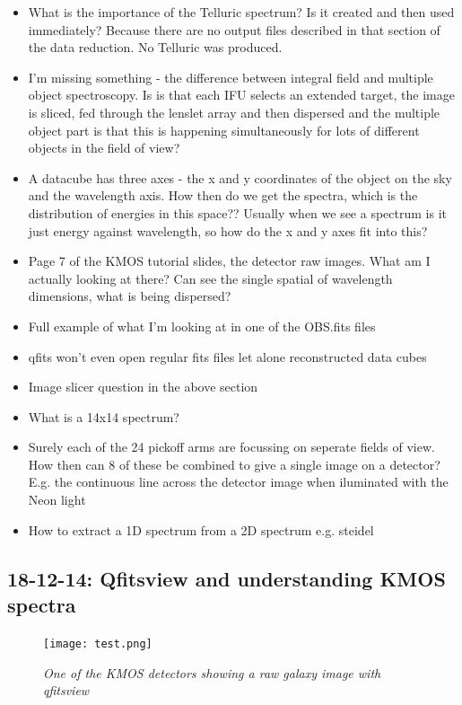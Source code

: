 \documentclass{literature}
\begin{document}
\begin{itemize}
	\item What is the importance of the Telluric spectrum? Is it created and then used immediately? Because there are no output files described in that section of the data reduction. No Telluric was produced.
	\item I'm missing something - the difference between integral field and multiple object spectroscopy. Is is that each IFU selects an extended target, the image is sliced, fed through the lenslet array and then dispersed and the multiple object part is that this is happening simultaneously for lots of different objects in the field of view? 
	\item A datacube has three axes - the x and y coordinates of the object on the sky and the wavelength axis. How then do we get the spectra, which is the distribution of energies in this space?? Usually when we see a spectrum is it just energy against wavelength, so how do the x and y axes fit into this? 
	\item Page 7 of the KMOS tutorial slides, the detector raw images. What am I actually looking at there? Can see the single spatial of wavelength dimensions, what is being dispersed? 
	\item Full example of what I'm looking at in one of the OBS.fits files
	\item qfits won't even open regular fits files let alone reconstructed data cubes
	\item Image slicer question in the above section
	\item What is a 14x14 spectrum? 
	\item Surely each of the 24 pickoff arms are focussing on seperate fields of view. How then can 8 of these be combined to give a single image on a detector? E.g. the continuous line across the detector image when iluminated with the Neon light 
	\item How to extract a 1D spectrum from a 2D spectrum e.g. steidel
\end{itemize}

\subsection{18-12-14: Qfitsview and understanding KMOS spectra}

\begin{figure}[!htp]
\centering
\texttt{[image: test.png]}
\caption{\footnotesize{\emph{One of the KMOS detectors showing a raw galaxy image with qfitsview}}}
\label{fig:raw_gal}
\end{figure}
\end{document}
